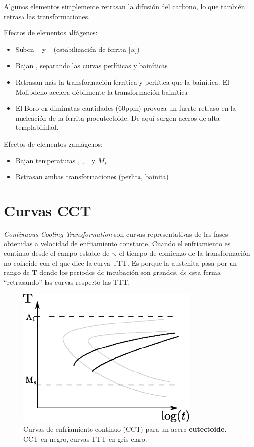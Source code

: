 Algunos elementos simplemente retrasan la difusión del carbono, lo que también retrasa las transformaciones.

Efectos de elementos alfágenos:
\begin{itemize}
    \item Suben \Aone~ y \Athree~ (estabilización de ferrita [$\alpha$])
    \item Bajan \Bs, separando las curvas perlíticas y bainíticas
    \item Retrasan más la transformación ferrítica y perlítica que la bainítica. El Molibdeno acelera débilmente la transformación bainítica
    \item El Boro en diminutas cantidades (60ppm) provoca un fuerte retraso en la nucleación de la ferrita proeutectoide. De aquí surgen aceros de alta templabilidad.
\end{itemize}

Efectos de elementos gamágenos:
\begin{itemize}
    \item Bajan temperaturas \Aone, \Athree, \Bs~ y $M_s$
    \item Retrasan ambas transformaciones (perlita, bainita)
\end{itemize}

\section{Curvas CCT}
\textit{Continuous Cooling Transformation} son curvas representativas de las fases obtenidas a velocidad de enfriamiento constante. Cuando el enfriamiento es continuo desde el campo estable de $\gamma$, el tiempo de comienzo de la transformación no coincide con el que dice la curva TTT. Es porque la austenita pasa por un rango de T donde los periodos de incubación son grandes, de esta forma ``retrasando'' las curvas respecto las TTT.

\begin{figure}[htb!]
    \centering
    \includegraphics[width=0.8\textwidth]{fig/CCTeutect.eps}
    \caption{Curvas de enfriamiento continuo (CCT) para un acero \textbf{eutectoide}. CCT en negro, curvas TTT en gris claro.}
    \label{fig:CCTeutect}
\end{figure}

